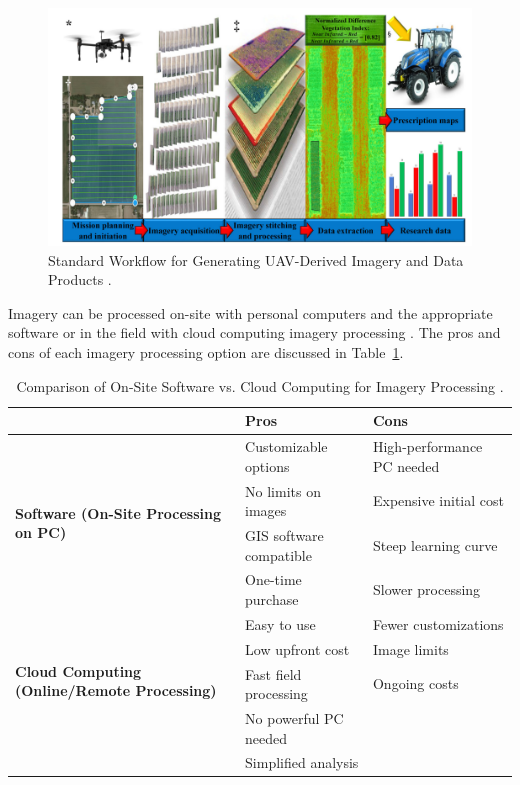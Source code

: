 \begin{figure}[H]
    \centering
    \includegraphics[width=0.8
    \textwidth]{chapters/chapter3/images/Figure06.png}
    \caption{Standard Workflow for Generating UAV-Derived Imagery and Data Products \protect\parencite{olson2021review}.}
    \label{fig:UAVDataProducts}
\end{figure}

Imagery can be processed on-site with personal computers and the appropriate software or in the field with cloud computing imagery processing \parencite{olson2021review}. The pros and cons of each imagery processing option are discussed in Table~\ref{tab:ProcessingMethodComparison}.

\begin{table}[h]
    \centering
    \renewcommand{\arraystretch}{1.5} %
    \setlength{\tabcolsep}{8pt} %
    \begin{tabular}{|p{3cm}|p{5.5cm}|p{5.5cm}|}
    \hline
     & \textbf{Pros} & \textbf{Cons} \\ \hline
    
     \multirow{4}{*}{\parbox{2.8cm}{\centering\textbf{Software (On-Site Processing on PC)}}}    & Customizable options & High-performance PC needed \\ \cline{2-3}
    & No limits on images & Expensive initial cost \\ \cline{2-3}
    & GIS software compatible & Steep learning curve \\ \cline{2-3}
    & One-time purchase & Slower processing \\ \hline
    
    \multirow{4}{*}{\parbox{2.8cm}{\centering\textbf{Cloud Computing (Online/Remote Processing)}}}    & Easy to use & Fewer customizations \\ \cline{2-3}
    & Low upfront cost & Image limits \\ \cline{2-3}
    & Fast field processing & Ongoing costs \\ \cline{2-3}
    & No powerful PC needed & \\ \cline{2-3}
    & Simplified analysis & \\ \hline
    \end{tabular}
    \caption{Comparison of On-Site Software vs. Cloud Computing for Imagery Processing \parencite{olson2021review}.}
    \label{tab:ProcessingMethodComparison}
    \end{table}
    

